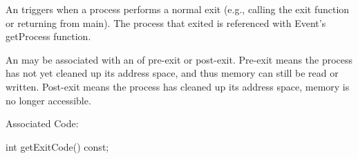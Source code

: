 
An  triggers when a process performs a normal exit (e.g.,
calling the exit function or returning from main). The process that exited is
referenced with Event's getProcess function.

An  may be associated with an  of pre-exit or
post-exit.
Pre-exit means the process has not yet cleaned up its address space, and thus
memory can still be read or written. Post-exit means the process has cleaned up
its address space, memory is no longer accessible.

Associated  Code: 

\begin{apient}
int getExitCode() const;
\end{apient}

